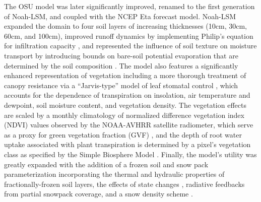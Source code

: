 The OSU model was later significantly improved, renamed to the first generation of Noah-LSM, and coupled with the NCEP Eta forecast model. Noah-LSM expanded the domain to four soil layers of increasing thicknesses (10cm, 30cm, 60cm, and 100cm), improved runoff dynamics by implementing Philip's equation for infiltration capacity \citep{schaake_simple_1996}, and represented the influence of soil texture on moisture transport by introducing bounds on bare-soil potential evaporation that are determined by the soil composition \citep{betts_assessment_1997} \citep{mahfouf_comparative_1991}. The model also features a significantly enhanced representation of vegetation including a more thorough treatment of canopy resistance via a ``Jarvis-type'' model of leaf stomatal control \citep{jarvis_interpretation_1976} \citep{jacquemin_sensitivity_1990}, which accounts for the dependence of transpiration on insolation, air temperature and dewpoint, soil moisture content, and vegetation density. The vegetation effects are scaled by a monthly climatology of normalized difference vegetation index (NDVI) values observed by the NOAA-AVHRR satellite radiometer, which serve as a proxy for green vegetation fraction (GVF) \citep{gutman_derivation_1998} \citep{chen_modeling_1996}, and the depth of root water uptake associated with plant transpiration is determined by a pixel's vegetation class as specified by the Simple Biosphere Model \citep{dorman_global_1989}. Finally, the model's utility was greatly expanded with the addition of a frozen soil and snow pack parameterization incorporating the thermal and hydraulic properties of fractionally-frozen soil layers, the effects of state changes \citep{chen_modeling_1996} \citep{koren_parameterization_1999}, radiative feedbacks from partial snowpack coverage, and a snow density scheme \citep{ek_implementation_2003}.

